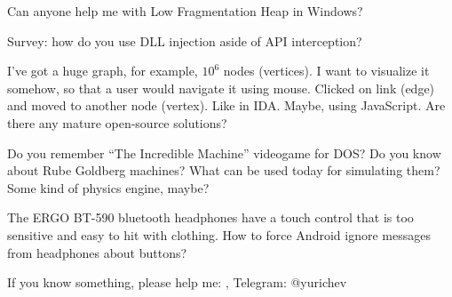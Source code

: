 \myhrule{}

Can anyone help me with Low Fragmentation Heap in Windows?

\myhrule{}

Survey: how do you use DLL injection aside of API interception?

\myhrule{}

I've got a huge graph, for example, $10^6$ nodes (vertices).
I want to visualize it somehow, so that a user would navigate it using mouse.
Clicked on link (edge) and moved to another node (vertex).
Like in IDA.
Maybe, using JavaScript.
Are there any mature open-source solutions?

\myhrule{}

Do you remember ``The Incredible Machine'' videogame for DOS?
Do you know about Rube Goldberg machines?
What can be used today for simulating them?
Some kind of physics engine, maybe?

\myhrule{}

The ERGO BT-590 bluetooth headphones have a touch control that is too sensitive and easy to hit with clothing.
How to force Android ignore messages from headphones about buttons?

\myhrule{}

If you know something, please help me: \EMAIL{}, Telegram: @yurichev

